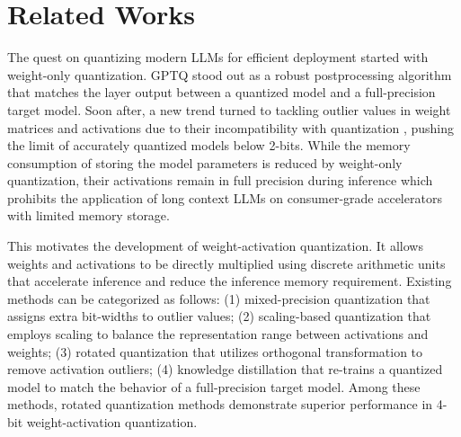 \section{Related Works}
The quest on quantizing modern LLMs for efficient deployment started with weight-only quantization. GPTQ \cite{frantar2022gptq} stood out as a robust postprocessing algorithm that matches the layer output between a quantized model and a full-precision target model. Soon after, a new trend turned to tackling outlier values in weight matrices and activations due to their incompatibility with quantization \cite{lin2023awq,lee2024owq,chee2024quip,tseng2024quip}, pushing the limit of accurately quantized models below 2-bits.
While the memory consumption of storing the model parameters is reduced by weight-only quantization, their activations remain in full precision during inference which prohibits the application of long context LLMs on consumer-grade accelerators with limited memory storage.

This motivates the development of weight-activation quantization. It allows weights and activations to be directly multiplied using discrete arithmetic units that accelerate inference and reduce the inference memory requirement.
Existing methods can be categorized as follows: 
(1) mixed-precision quantization  \cite{dettmers2022gpt3,zhao2024atom} that assigns extra bit-widths to outlier values;
(2) scaling-based quantization \cite{xiao2022smoothquant,shao2023omniquant} that employs scaling to balance the representation range between activations and weights;
(3) rotated quantization \cite{ashkboos2024quarot,liu2024spinquant} that utilizes orthogonal transformation to remove activation outliers; 
(4) knowledge distillation \cite{liu2023llm,du2024bitdistiller,xu2024onebit} that re-trains a quantized model to match the behavior of a full-precision target model.
Among these methods, rotated quantization methods demonstrate superior performance in 4-bit weight-activation quantization.